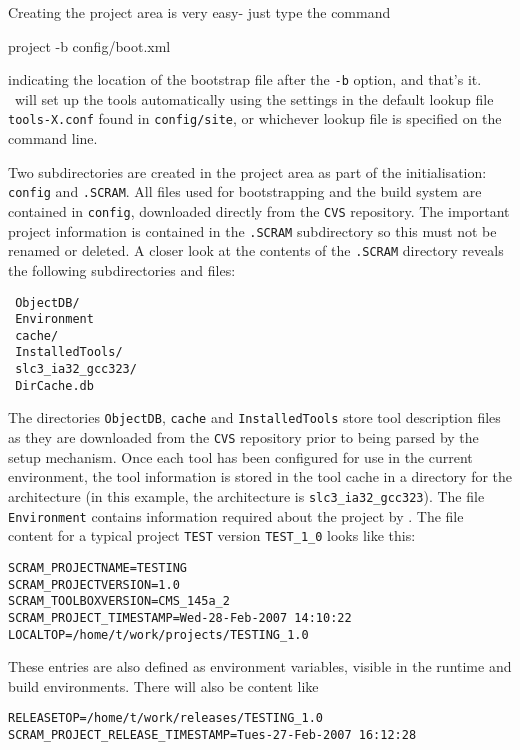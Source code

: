 \ni Creating the project area is very easy- just type the command

\begin{scramcmd}{project -b config/boot.xml}\end{scramcmd}

\ni indicating the location of the bootstrap file after the \texttt{-b} 
option, and that's it. \scram\ will set up the tools automatically
using the settings in the default lookup file \texttt{tools-X.conf}
found in \texttt{config/site}, or whichever lookup file is
specified on the command line.

\ni Two subdirectories are created in the project area as part of the
initialisation: \texttt{config} and \texttt{.SCRAM}. All files used
for bootstrapping and the build system are contained in
\texttt{config}, downloaded directly from the \texttt{CVS} repository. The
important project information is contained in the \texttt{.SCRAM}
subdirectory
\label{sec:dotSCRAMcontents}
 so this must not be renamed or
deleted. A closer look at the contents of the \texttt{.SCRAM}
directory reveals the following subdirectories and files:

\small{
\begin{verbatim}
 ObjectDB/
 Environment
 cache/
 InstalledTools/
 slc3_ia32_gcc323/
 DirCache.db
\end{verbatim}
}\normalsize

\ni The directories \texttt{ObjectDB}, \texttt{cache} and
\texttt{InstalledTools} store tool description files as they are downloaded
from the \texttt{CVS} repository prior to being parsed by the setup mechanism.
Once each tool has been configured for use in the current environment,
the tool information is stored in the tool cache in
a directory for the architecture (in this example,
the architecture is \texttt{slc3\_ia32\_gcc323}). The file
\texttt{Environment} contains information required about the project
by \scram. The file content for a typical project \texttt{TEST} version 
\texttt{TEST\_1\_0} looks like this: 

\small{
\begin{verbatim}
SCRAM_PROJECTNAME=TESTING
SCRAM_PROJECTVERSION=1.0
SCRAM_TOOLBOXVERSION=CMS_145a_2
SCRAM_PROJECT_TIMESTAMP=Wed-28-Feb-2007 14:10:22
LOCALTOP=/home/t/work/projects/TESTING_1.0
\end{verbatim}}\normalsize 
%
\ni These entries are also defined as environment variables, visible in
the runtime and build environments. There will also be content like
\small{
\begin{verbatim}
RELEASETOP=/home/t/work/releases/TESTING_1.0
SCRAM_PROJECT_RELEASE_TIMESTAMP=Tues-27-Feb-2007 16:12:28
\end{verbatim}
}\normalsize


